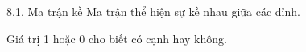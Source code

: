 \documentclass{beamer}
\begin{document}
\begin{frame}{8.1. Ma trận kề}
\Large
Ma trận thể hiện sự kề nhau giữa các đỉnh.

\vspace{0.3cm}
Giá trị 1 hoặc 0 cho biết có cạnh hay không.
\end{frame}
\end{document}
